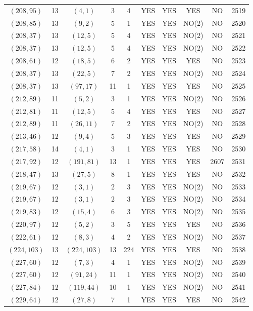 \begin{longtable}{|c|c|c|c|c|c|c|c|c|c|}
$(208, 95)$ & 13 & $(4, 1)$ & 3 & 4 & YES & YES & YES & NO & 2519\\
$(208, 85)$ & 13 & $(9, 2)$ & 5 & 1 & YES & YES & NO(2) & NO & 2520\\
$(208, 37)$ & 13 & $(12, 5)$ & 5 & 4 & YES & YES & NO(2) & NO & 2521\\
$(208, 37)$ & 13 & $(12, 5)$ & 5 & 4 & YES & YES & NO(2) & NO & 2522\\
$(208, 61)$ & 12 & $(18, 5)$ & 6 & 2 & YES & YES & YES & NO & 2523\\
$(208, 37)$ & 13 & $(22, 5)$ & 7 & 2 & YES & YES & NO(2) & NO & 2524\\
$(208, 37)$ & 13 & $(97, 17)$ & 11 & 1 & YES & YES & YES & NO & 2525\\
$(212, 89)$ & 11 & $(5, 2)$ & 3 & 1 & YES & YES & NO(2) & NO & 2526\\
$(212, 81)$ & 11 & $(12, 5)$ & 5 & 4 & YES & YES & YES & NO & 2527\\
$(212, 89)$ & 11 & $(26, 11)$ & 7 & 2 & YES & YES & NO(2) & NO & 2528\\
$(213, 46)$ & 12 & $(9, 4)$ & 5 & 3 & YES & YES & YES & NO & 2529\\
$(217, 58)$ & 14 & $(4, 1)$ & 3 & 1 & YES & YES & YES & NO & 2530\\
$(217, 92)$ & 12 & $(191, 81)$ & 13 & 1 & YES & YES & YES & 2607 & 2531\\
$(218, 47)$ & 13 & $(27, 5)$ & 8 & 1 & YES & YES & YES & NO & 2532\\
$(219, 67)$ & 12 & $(3, 1)$ & 2 & 3 & YES & YES & NO(2) & NO & 2533\\
$(219, 67)$ & 12 & $(3, 1)$ & 2 & 3 & YES & YES & NO(2) & NO & 2534\\
$(219, 83)$ & 12 & $(15, 4)$ & 6 & 3 & YES & YES & NO(2) & NO & 2535\\
$(220, 97)$ & 12 & $(5, 2)$ & 3 & 5 & YES & YES & YES & NO & 2536\\
$(222, 61)$ & 12 & $(8, 3)$ & 4 & 2 & YES & YES & NO(2) & NO & 2537\\
$(224, 103)$ & 13 & $(224, 103)$ & 13 & 224 & YES & YES & YES & NO & 2538\\
$(227, 60)$ & 12 & $(7, 3)$ & 4 & 1 & YES & YES & NO(2) & NO & 2539\\
$(227, 60)$ & 12 & $(91, 24)$ & 11 & 1 & YES & YES & NO(2) & NO & 2540\\
$(227, 84)$ & 12 & $(119, 44)$ & 10 & 1 & YES & YES & NO(2) & NO & 2541\\
$(229, 64)$ & 12 & $(27, 8)$ & 7 & 1 & YES & YES & YES & NO & 2542\\

\end{longtable}
